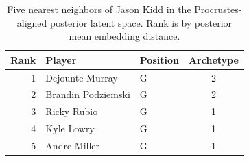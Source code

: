 \begin{table}[htbp]
  \centering\small
  \begin{tabular}{rllc}
    \toprule
    Rank & Player & Position & Archetype \\
    \midrule
    1 & Dejounte Murray & G & 2 \\
    2 & Brandin Podziemski & G & 2 \\
    3 & Ricky Rubio & G & 1 \\
    4 & Kyle Lowry & G & 1 \\
    5 & Andre Miller & G & 1 \\
    \bottomrule
  \end{tabular}
  \caption{Five nearest neighbors of Jason Kidd in the Procrustes-aligned posterior latent space. Rank is by posterior mean embedding distance.}
  \label{tab:Jason_Kidd_neighbors}
\end{table}


